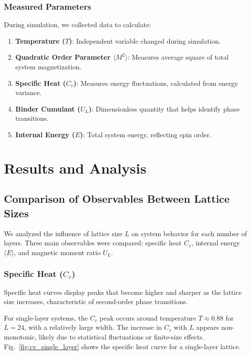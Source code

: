 \documentclass[conference, compsoc, twoside]{IEEEtran}
\begin{document}
\subsubsection{Measured Parameters}

During simulation, we collected data to calculate:

\begin{enumerate}
\item \textbf{Temperature ($T$)}: Independent variable changed during simulation.
\item \textbf{Quadratic Order Parameter $\langle M^2 \rangle$}: Measures average square of total system magnetization.
\item \textbf{Specific Heat ($C_v$)}: Measures energy fluctuations, calculated from energy variance.
\item \textbf{Binder Cumulant ($U_L$)}: Dimensionless quantity that helps identify phase transitions.
\item \textbf{Internal Energy ($E$)}: Total system energy, reflecting spin order.
\end{enumerate} 

\section{Results and Analysis}

\subsection{Comparison of Observables Between Lattice Sizes}

We analyzed the influence of lattice size $L$ on system behavior for each number of layers. Three main observables were compared: specific heat $C_v$, internal energy $\langle E \rangle$, and magnetic moment ratio $U_L$.

\subsubsection{Specific Heat ($C_v$)}

Specific heat curves display peaks that become higher and sharper as the lattice size increases, characteristic of second-order phase transitions.

For single-layer systems, the $C_v$ peak occurs around temperature $T \approx 0.88$ for $L = 24$, with a relatively large width. The increase in $C_v$ with $L$ appears non-monotonic, likely due to statistical fluctuations or finite-size effects. Fig.~\ref{fig:cv_single_layer} shows the specific heat curve for a single-layer lattice.
\end{document}
